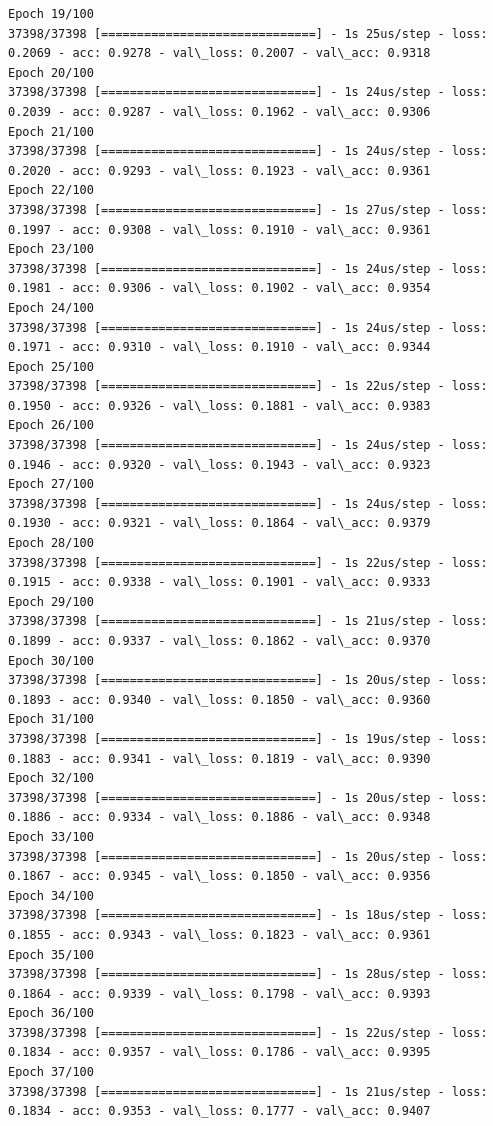 \documentclass[11pt]{article}
\begin{document}
\begin{Verbatim}[commandchars=\\\{\}]
Epoch 19/100
37398/37398 [==============================] - 1s 25us/step - loss: 0.2069 - acc: 0.9278 - val\_loss: 0.2007 - val\_acc: 0.9318
Epoch 20/100
37398/37398 [==============================] - 1s 24us/step - loss: 0.2039 - acc: 0.9287 - val\_loss: 0.1962 - val\_acc: 0.9306
Epoch 21/100
37398/37398 [==============================] - 1s 24us/step - loss: 0.2020 - acc: 0.9293 - val\_loss: 0.1923 - val\_acc: 0.9361
Epoch 22/100
37398/37398 [==============================] - 1s 27us/step - loss: 0.1997 - acc: 0.9308 - val\_loss: 0.1910 - val\_acc: 0.9361
Epoch 23/100
37398/37398 [==============================] - 1s 24us/step - loss: 0.1981 - acc: 0.9306 - val\_loss: 0.1902 - val\_acc: 0.9354
Epoch 24/100
37398/37398 [==============================] - 1s 24us/step - loss: 0.1971 - acc: 0.9310 - val\_loss: 0.1910 - val\_acc: 0.9344
Epoch 25/100
37398/37398 [==============================] - 1s 22us/step - loss: 0.1950 - acc: 0.9326 - val\_loss: 0.1881 - val\_acc: 0.9383
Epoch 26/100
37398/37398 [==============================] - 1s 24us/step - loss: 0.1946 - acc: 0.9320 - val\_loss: 0.1943 - val\_acc: 0.9323
Epoch 27/100
37398/37398 [==============================] - 1s 24us/step - loss: 0.1930 - acc: 0.9321 - val\_loss: 0.1864 - val\_acc: 0.9379
Epoch 28/100
37398/37398 [==============================] - 1s 22us/step - loss: 0.1915 - acc: 0.9338 - val\_loss: 0.1901 - val\_acc: 0.9333
Epoch 29/100
37398/37398 [==============================] - 1s 21us/step - loss: 0.1899 - acc: 0.9337 - val\_loss: 0.1862 - val\_acc: 0.9370
Epoch 30/100
37398/37398 [==============================] - 1s 20us/step - loss: 0.1893 - acc: 0.9340 - val\_loss: 0.1850 - val\_acc: 0.9360
Epoch 31/100
37398/37398 [==============================] - 1s 19us/step - loss: 0.1883 - acc: 0.9341 - val\_loss: 0.1819 - val\_acc: 0.9390
Epoch 32/100
37398/37398 [==============================] - 1s 20us/step - loss: 0.1886 - acc: 0.9334 - val\_loss: 0.1886 - val\_acc: 0.9348
Epoch 33/100
37398/37398 [==============================] - 1s 20us/step - loss: 0.1867 - acc: 0.9345 - val\_loss: 0.1850 - val\_acc: 0.9356
Epoch 34/100
37398/37398 [==============================] - 1s 18us/step - loss: 0.1855 - acc: 0.9343 - val\_loss: 0.1823 - val\_acc: 0.9361
Epoch 35/100
37398/37398 [==============================] - 1s 28us/step - loss: 0.1864 - acc: 0.9339 - val\_loss: 0.1798 - val\_acc: 0.9393
Epoch 36/100
37398/37398 [==============================] - 1s 22us/step - loss: 0.1834 - acc: 0.9357 - val\_loss: 0.1786 - val\_acc: 0.9395
Epoch 37/100
37398/37398 [==============================] - 1s 21us/step - loss: 0.1834 - acc: 0.9353 - val\_loss: 0.1777 - val\_acc: 0.9407

\end{Verbatim}
\end{document}
